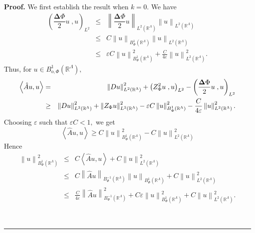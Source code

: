 \documentclass{article}
\newenvironment{proof}[1][Proof]{\noindent\textbf{#1.} }{\ \rule{0.5em}{0.5em}}
\begin{document}
\begin{proof}
We first establish the result when $k=0.$ We have%
\begin{eqnarray}
\left( \dfrac{\mathbf{\Delta }\Phi }{2}u\;,u\right) _{L^{2}} &\leq &\left\| 
\dfrac{\mathbf{\Delta }\Phi }{2}u\right\| _{L^{2}(\mathbb{R}^{\Lambda
})}\left\| u\right\| _{L^{2}(\mathbb{R}^{\Lambda })} \\
&\leq &C\left\| u\right\| _{B_{\Phi }^{1}(\mathbb{R}^{\Lambda })}\left\|
u\right\| _{L^{2}(\mathbb{R}^{\Lambda })} \\
&\leq &\varepsilon C\left\| u\right\| _{B_{\Phi }^{1}(\mathbb{R}^{\Lambda
})}^{2}+\frac{C}{4\varepsilon }\left\| u\right\| _{L^{2}(\mathbb{R}^{\Lambda
})}^{2}.
\end{eqnarray}%
Thus, for $u\in B_{o,\Phi }^{1}(\mathbb{R}^{\Lambda }),$%
\begin{eqnarray*}
\left\langle \hat{A}u,u\right\rangle &=&\left\| Du\right\| _{L^{2}(\mathbb{R}%
^{\Lambda })}^{2}+\left( Z_{\Phi }^{2}u\;,u\right) _{L^{2}}-\left( \dfrac{%
\mathbf{\Delta }\Phi }{2}u\;,u\right) _{L^{2}} \\
&\geq &\left\| Du\right\| _{L^{2}(\mathbb{R}^{\Lambda })}^{2}+\left\|
Z_{\Phi }u\right\| _{L^{2}(\mathbb{R}^{\Lambda })}^{2}-\varepsilon C\left\|
u\right\| _{B_{\Phi }^{1}(\mathbb{R}^{\Lambda })}^{2}-\frac{C}{4\varepsilon }%
\left\| u\right\| _{L^{2}(\mathbb{R}^{\Lambda })}^{2}.
\end{eqnarray*}%
Choosing $\varepsilon $ such that $\varepsilon C<1,$ we get%
\begin{equation*}
\left\langle \hat{A}u,u\right\rangle \geq C\left\| u\right\| _{B_{\Phi }^{1}(%
\mathbb{R}^{\Lambda })}^{2}-C\left\| u\right\| _{L^{2}(\mathbb{R}^{\Lambda
})}^{2}
\end{equation*}%
Hence 
\begin{eqnarray*}
\left\| u\right\| _{B_{\Phi }^{1}(\mathbb{R}^{\Lambda })}^{2} &\leq
&C\left\langle \hat{A}u,u\right\rangle +C\left\| u\right\| _{L^{2}(\mathbb{R}%
^{\Lambda })}^{2} \\
&\leq &C\left\| \hat{A}u\right\| _{B_{\Phi }^{-1}(\mathbb{R}^{\Lambda
})}\left\| u\right\| _{B_{\Phi }^{1}(\mathbb{R}^{\Lambda })}+C\left\|
u\right\| _{L^{2}(\mathbb{R}^{\Lambda })}^{2} \\
&\leq &\frac{C}{4\varepsilon }\left\| \hat{A}u\right\| _{B_{\Phi }^{-1}(%
\mathbb{R}^{\Lambda })}^{2}+C\varepsilon \left\| u\right\| _{B_{\Phi }^{1}(%
\mathbb{R}^{\Lambda })}^{2}+C\left\| u\right\| _{L^{2}(\mathbb{R}^{\Lambda
})}^{2}.
\end{eqnarray*}%

\end{proof}
\end{document}
